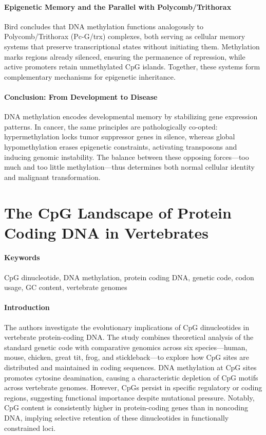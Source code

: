 \documentclass[10pt]{extarticle}
\begin{document}
\paragraph{Epigenetic Memory and the Parallel with Polycomb/Trithorax}
Bird concludes that DNA methylation functions analogously to Polycomb/Trithorax (Pc-G/trx) complexes, both serving as cellular memory systems that preserve transcriptional states without initiating them. Methylation marks regions already silenced, ensuring the permanence of repression, while active promoters retain unmethylated CpG islands. Together, these systems form complementary mechanisms for epigenetic inheritance.

\paragraph{Conclusion: From Development to Disease}
DNA methylation encodes developmental memory by stabilizing gene expression patterns. In cancer, the same principles are pathologically co-opted: hypermethylation locks tumor suppressor genes in silence, whereas global hypomethylation erases epigenetic constraints, activating transposons and inducing genomic instability. The balance between these opposing forces—too much and too little methylation—thus determines both normal cellular identity and malignant transformation.

\section{The CpG Landscape of Protein Coding DNA in Vertebrates}

\paragraph{Keywords}
CpG dinucleotide, DNA methylation, protein coding DNA, genetic code, codon usage, GC content, vertebrate genomes \cite{wilcox2025cpg}

\paragraph{Introduction}
The authors investigate the evolutionary implications of CpG dinucleotides in vertebrate protein-coding DNA. The study combines theoretical analysis of the standard genetic code with comparative genomics across six species—human, mouse, chicken, great tit, frog, and stickleback—to explore how CpG sites are distributed and maintained in coding sequences. DNA methylation at CpG sites promotes cytosine deamination, causing a characteristic depletion of CpG motifs across vertebrate genomes. However, CpGs persist in specific regulatory or coding regions, suggesting functional importance despite mutational pressure. Notably, CpG content is consistently higher in protein-coding genes than in noncoding DNA, implying selective retention of these dinucleotides in functionally constrained loci.
\end{document}
